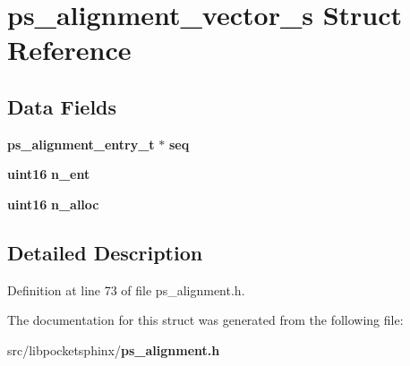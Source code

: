 \section{ps\-\_\-alignment\-\_\-vector\-\_\-s \-Struct \-Reference}
\label{structps__alignment__vector__s}
\subsection*{\-Data \-Fields}
\begin{DoxyCompactItemize}
\item 
{\bf ps\-\_\-alignment\-\_\-entry\-\_\-t} $\ast$ {\bfseries seq}\label{structps__alignment__vector__s_a5bfae302b7ca4bddde35600d157bc2a2}

\item 
{\bf uint16} {\bfseries n\-\_\-ent}\label{structps__alignment__vector__s_ac45b2f21982334d415bed78abfeba66d}

\item 
{\bf uint16} {\bfseries n\-\_\-alloc}\label{structps__alignment__vector__s_a18d4510d8a2495ac96bb0c295b725c83}

\end{DoxyCompactItemize}


\subsection{\-Detailed \-Description}


\-Definition at line 73 of file ps\-\_\-alignment.\-h.



\-The documentation for this struct was generated from the following file\-:\begin{DoxyCompactItemize}
\item 
src/libpocketsphinx/{\bf ps\-\_\-alignment.\-h}\end{DoxyCompactItemize}
